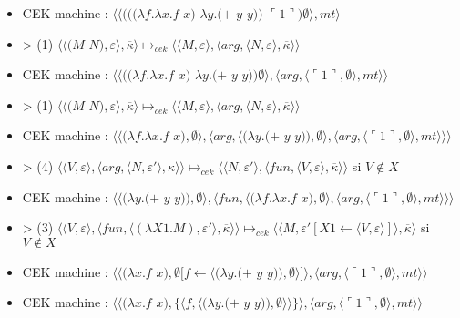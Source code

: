 \documentclass[10pt,a4paper]{article}
\begin{document}
				\begin{itemize}
					\item[] CEK machine : $\langle\langle(((\lambda f.\lambda x.f$ $x)$ $\lambda y.(+$ $y$ $y))$ $\ulcorner 1\urcorner)\emptyset\rangle,mt\rangle$
					\item[] > (1) $\langle\langle(M$ $N),\varepsilon\rangle,\overline{\kappa}\rangle \longmapsto_{cek} \langle \langle M,\varepsilon\rangle,\langle arg,\langle N,\varepsilon\rangle,\overline{\kappa}\rangle\rangle$
					\item[] CEK machine : $\langle\langle((\lambda f.\lambda x.f$ $x)$ $\lambda y.(+$ $y$ $y))\emptyset\rangle,\langle arg,\langle\ulcorner 1\urcorner,\emptyset\rangle,mt\rangle\rangle$
					\item[] > (1) $\langle\langle(M$ $N),\varepsilon\rangle,\overline{\kappa}\rangle \longmapsto_{cek} \langle \langle M,\varepsilon\rangle,\langle arg,\langle N,\varepsilon\rangle,\overline{\kappa}\rangle\rangle$
					\item[] CEK machine : $\langle\langle(\lambda f.\lambda x.f$ $x),\emptyset\rangle,\langle arg,\langle(\lambda y.(+$ $y$ $y)),\emptyset\rangle,\langle arg,\langle\ulcorner 1\urcorner,\emptyset\rangle,mt\rangle\rangle\rangle$
					\item[] > (4) $\langle \langle V,\varepsilon\rangle,\langle arg,\langle N,\varepsilon'\rangle,\kappa\rangle\rangle \longmapsto_{cek} \langle \langle N,\varepsilon'\rangle,\langle fun,\langle V,\varepsilon\rangle,\overline{\kappa}\rangle\rangle$ si $V \notin X$
					\item[] CEK machine : $\langle\langle(\lambda y.(+$ $y$ $y)),\emptyset\rangle,\langle fun,\langle(\lambda f.\lambda x.f$ $x),\emptyset\rangle,\langle arg,\langle\ulcorner 1\urcorner,\emptyset\rangle,mt\rangle\rangle\rangle$
					\item[] > (3) $\langle\langle V,\varepsilon\rangle,\langle fun,\langle (\lambda X1.M),\varepsilon'\rangle,\overline{\kappa} \rangle \rangle \longmapsto_{cek} \langle \langle M,\varepsilon'[X1 \leftarrow \langle V,\varepsilon\rangle]\rangle,\overline{\kappa}\rangle$ si $V \notin X$
					\item[] CEK machine : $\langle\langle(\lambda x.f$ $x),\emptyset[f \leftarrow \langle(\lambda y.(+$ $y$ $y)),\emptyset\rangle]\rangle,\langle arg,\langle\ulcorner 1\urcorner,\emptyset\rangle,mt\rangle\rangle$
					\item[] CEK machine : $\langle\langle(\lambda x.f$ $x),\{\langle f,\langle(\lambda y.(+$ $y$ $y)),\emptyset\rangle\rangle\}\rangle,\langle arg,\langle\ulcorner 1\urcorner,\emptyset\rangle,mt\rangle\rangle$

\end{itemize}
\end{document}
